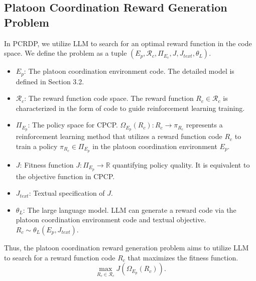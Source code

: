 \documentclass[lettersize,journal]{IEEEtran}
\begin{document}
\subsection{Platoon Coordination Reward Generation Problem}
In PCRDP, we utilize LLM to search for an optimal reward function in the code space. 
We define the problem as a tuple $(E_p,\mathcal{R}_c,\Pi_{E_c}, J, J_{text}, \theta_L)$.
\begin{itemize}
    \item [-] $E_p$: The platoon coordination environment code. The detailed model is defined in Section 3.2.
    \item [-] $\mathcal{R}_c$: The reward function code space. The reward function $R_c \in \mathcal{R}_c$ is characterized in the form of code to guide reinforcement learning training.
    \item [-] $\Pi_{E_p}$: The policy space for CPCP. $\Omega_{E_p}(R_c):R_c\rightarrow \pi_{R_c}$ represents a reinforcement learning method that utilizes a reward function code $R_c$ to train a policy $\pi_{R_c} \in \Pi_{E_p}$ in the platoon coordination environment $E_p$. 
    \item [-] $J$: Fitness function $J:\Pi_{E_p}\rightarrow\mathbb{R}$ quantifying policy quality. It is equivalent to the objective function in CPCP.
    \item [-] $J_{text}$: Textual specification of $J$. 
    \item [-] $\theta_L$: The large language model. LLM can generate a reward code via the platoon coordination environment code and textual objective. $R_c \sim \theta_L(E_p, J_{text})$.

\end{itemize}
Thus, the platoon coordination reward generation problem aims to utilize LLM to search for a reward function code $R_c$ that maximizes the fitness function.
\begin{equation}
    \label{eqpcrdp}
    \max \limits_{R_c \in \mathcal{R}_c} J(\Omega_{E_p} (R_c)).
\end{equation}
\end{document}

